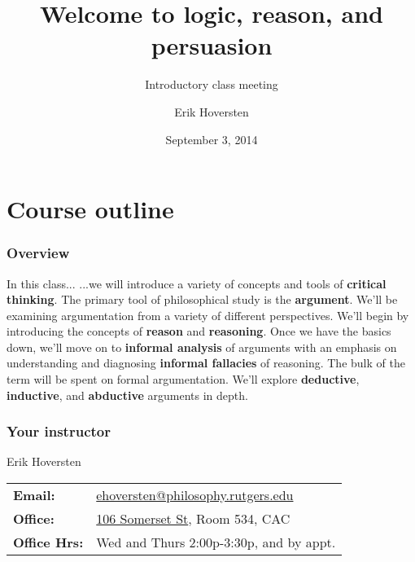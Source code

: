\documentclass[10pt,letterpaper,xcolor=dvipsnames,handout]{beamer}
\title{Welcome to logic, reason, and persuasion}
\subtitle{Introductory class meeting}
\author[Hoversten]{Erik Hoversten}
\institute[lrp-f14]{Logic, reason, and persuasion: fall 2014 \\ Rutgers University}
\date[09/03/2014]{September 3, 2014}
\begin{document}
\begin{frame}
\titlepage
\end{frame}

\section{Course outline}

\begin{frame}
\frametitle{Overview}

\begin{block}{In this class...}
...we will introduce a variety of concepts and tools of \textbf{critical thinking}.  The primary tool of philosophical study is the \textbf{argument}.  We'll be examining argumentation from a variety of different perspectives.  We'll begin by introducing the concepts of \textbf{reason} and \textbf{reasoning}.  Once we have the basics down, we'll move on to \textbf{informal analysis} of arguments with an emphasis on understanding and diagnosing \textbf{informal fallacies} of reasoning.  The bulk of the term will be spent on formal argumentation.  We'll explore \textbf{deductive}, \textbf{inductive}, and \textbf{abductive} arguments in depth.
\end{block}

\end{frame}

\begin{frame}
\frametitle{Your instructor}

\begin{block}{Erik Hoversten}
  \begin{tabular}{ll}
    \textbf{Email:} & \href{mailto:ehoversten@philosophy.rutgers.edu}{ehoversten@philosophy.rutgers.edu} \\
    \textbf{Office:} & \href{http://rumaps.rutgers.edu/location/gateway-transit-village}{106 Somerset St}, Room 534, CAC \\
    \textbf{Office Hrs:} & Wed and Thurs 2:00p-3:30p, and by appt. \\
  \end{tabular}
\end{block}

\end{frame}
\end{document}
